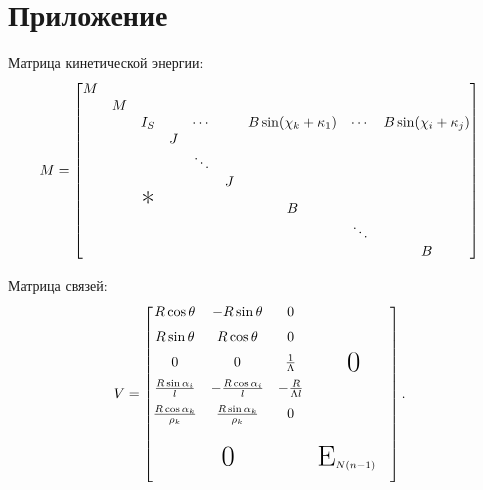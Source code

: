 \section{Приложение}
Матрица кинетической энергии:
$$
M = \begin{bmatrix}
    M &   &               &   &        &   &                        &        &                        \\
      & M &               &   &        &   &                        &        &                        \\
      &   & I_S           &   & \cdots &   & B\sin(\chi_k+\kappa_1) & \cdots & B\sin(\chi_i+\kappa_j) \\
      &   &               & J &        &   &                        &        &                        \\
      &   &               &   & \ddots &   &                        &        &                        \\
      &   &               &   &        & J &                        &        &                        \\
      &   & \text{\huge*} &   &        &   & B                      &        &                        \\
      &   &               &   &        &   &                        & \ddots &                        \\
      &   &               &   &        &   &                        &        & B                      \\
\end{bmatrix}
$$

Матрица связей:
$$
V = \begin{bmatrix}
    \begin{matrix}
        R\cos\theta                  & -R\sin\theta                  & 0                    \\[6pt]
        R\sin\theta                  &  R\cos\theta                  & 0                    \\[6pt]
        0                            & 0                             & \frac{1}{\Lambda}    \\[6pt]
        \frac{R\sin\alpha_i}{l}      & -\frac{R\cos\alpha_i}{l}      & -\frac{R}{\Lambda l} \\[6pt]
        \frac{R\cos\alpha_k}{\rho_k} &  \frac{R\sin\alpha_k}{\rho_k} & 0                    \\[6pt]
    \end{matrix}   & \text{\huge 0}                \\[50pt]
    \text{\huge 0} & \text{\huge E}_{N(n-1)} \quad \\[10pt]
\end{bmatrix}.
$$

